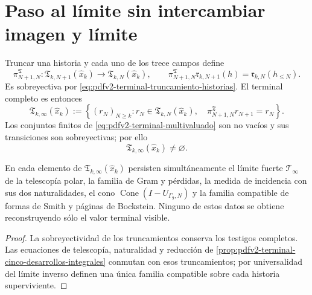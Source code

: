 \section{Paso al l\'imite sin intercambiar imagen y l\'imite}

Truncar una historia y cada uno de los trece campos define
\begin{equation}
\label{eq:pdfv2-terminal-transicion-horizonte}
 \pi^{\mathfrak T}_{N+1,N}:
 \mathfrak T_{k,N+1}(\widehat x_k)\longrightarrow
 \mathfrak T_{k,N}(\widehat x_k),
 \qquad
 \pi^{\mathfrak T}_{N+1,N}\mathfrak r_{k,N+1}(h)
 =\mathfrak r_{k,N}(h_{\leq N}).
\end{equation}
Es sobreyectiva por
\eqref{eq:pdfv2-terminal-truncamiento-historias}. El terminal completo es
entonces
\begin{equation}
\label{eq:pdfv2-terminal-limite-inverso}
 \mathfrak T_{k,\infty}(\widehat x_k)
 :=\left\{(r_N)_{N\geq k}:
 r_N\in\mathfrak T_{k,N}(\widehat x_k),\quad
 \pi^{\mathfrak T}_{N+1,N}r_{N+1}=r_N\right\}.
\end{equation}
Los conjuntos finitos de
\eqref{eq:pdfv2-terminal-multivaluado} son no vac\'ios y sus transiciones
son sobreyectivas; por ello
\begin{equation}
\label{eq:pdfv2-terminal-limite-no-vacio}
 \mathfrak T_{k,\infty}(\widehat x_k)\neq\varnothing.
\end{equation}

\begin{corollary}
\label{cor:pdfv2-terminal-limite-cinco-desarrollos}
En cada elemento de
\(\mathfrak T_{k,\infty}(\widehat x_k)\) persisten simultáneamente el límite
fuerte \(\mathcal T_\infty\) de la telescopía polar, la familia de Gram y
pérdidas, la medida de incidencia con sus dos naturalidades, el cono
\(\operatorname{Cone}(I-U_{\Gamma_9,N})\) y la familia compatible de formas
de Smith y páginas de Bockstein. Ninguno de estos datos se obtiene
reconstruyendo sólo el valor terminal visible.
\end{corollary}

\begin{proof}
La sobreyectividad de los truncamientos conserva los testigos completos. Las
ecuaciones de telescopía, naturalidad y reducción de
\cref{prop:pdfv2-terminal-cinco-desarrollos-integrales} conmutan con esos
truncamientos; por universalidad del límite inverso definen una única familia
compatible sobre cada historia superviviente.
\end{proof}

